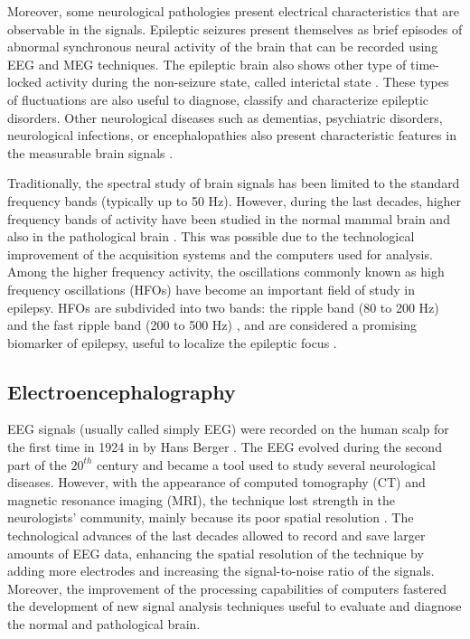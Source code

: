 Moreover, some neurological pathologies present electrical characteristics that are observable in the signals. Epileptic seizures present themselves as brief episodes of abnormal synchronous neural activity of the brain \citep{Fisher2005} that can be recorded using EEG and MEG techniques. The epileptic brain also shows other type of time-locked activity during the non-seizure state, called interictal state \citep{Smith2005}. These types of fluctuations are also useful to diagnose, classify and characterize epileptic disorders. Other neurological diseases such as dementias, psychiatric disorders, neurological infections, or encephalopathies also present characteristic features in the measurable brain signals \citep{Smith2005}.
        
        Traditionally, the spectral study of brain signals has been limited to the standard frequency bands (typically up to 50 Hz). However, during the last decades, higher frequency bands of activity have been studied in the normal mammal brain \citep{Buzsaki1992} and also in the pathological brain \citep{Fisher1992}. This was possible due to the technological improvement of the acquisition systems and the computers used for analysis. Among the higher frequency activity, the oscillations commonly known as high frequency oscillations (HFOs) have become an important field of study in epilepsy. HFOs are subdivided into two bands: the ripple band (80 to 200 Hz) and the fast ripple band (200 to 500 Hz) \citep{Gotman2010}, and are considered a promising biomarker of epilepsy, useful to localize the epileptic focus \citep{Jacobs2012}.  
          \subsection{Electroencephalography}
          EEG signals (usually called simply EEG) were recorded on the human scalp for the first time in 1924 in by Hans Berger \citep{Sornmo2005}. The EEG evolved during the second part of the $20^{th}$ century and became a tool used to study several neurological diseases. However, with the appearance of computed tomography (CT) and magnetic resonance imaging (MRI), the technique lost strength in the neurologists' community, mainly because its poor spatial resolution \citep{Zifkin2009}. The technological advances of the last decades allowed to record and save larger amounts of EEG data, enhancing the spatial resolution of the technique by adding more electrodes and increasing the signal-to-noise ratio of the signals. Moreover, the improvement of the processing capabilities of computers fastered the development of new signal analysis techniques useful to evaluate and diagnose the normal and pathological brain. 
 
